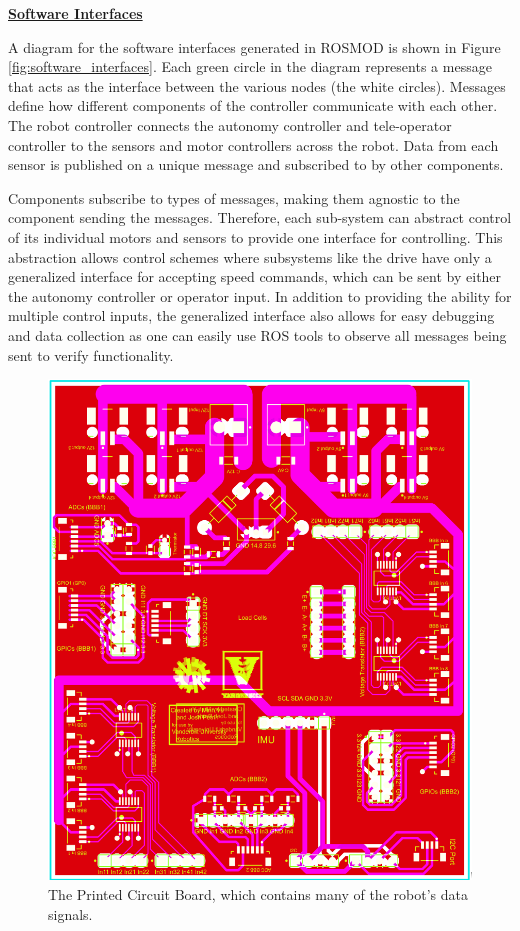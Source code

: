 \documentclass[class=article, crop=false]{standalone}
\begin{document}
	\vspace*{0.1in}
	\noindent\textbf{\underline{Software Interfaces}}
	
	A diagram for the software interfaces generated in ROSMOD is shown in Figure \ref{fig:software_interfaces}. Each green circle in the diagram represents a message that acts as the interface between the various nodes (the white circles). Messages define how different components of the controller communicate with each other. The robot controller connects the autonomy controller and tele-operator controller to the sensors and motor controllers across the robot. Data from each sensor is published on a unique message and subscribed to by other components. 
	
	Components subscribe to types of messages, making them agnostic to the component sending the messages. Therefore, each sub-system can abstract control of its individual motors and sensors to provide one interface for controlling. This abstraction allows control schemes where subsystems like the drive have only a generalized interface for accepting speed commands, which can be sent by either the autonomy controller or operator input. In addition to providing the ability for multiple control inputs, the generalized interface also allows for easy debugging and data collection as one can easily use ROS tools to observe all messages being sent to verify functionality.
		
	\FloatBarrier
	\begin{figure}[h]
		\centering
		\includegraphics[width=0.6\linewidth]{09_Figures/pcb.jpg}
		\caption{The Printed Circuit Board, which contains many of the robot's data signals.}
		\label{fig:pcb}
	\end{figure}
	\FloatBarrier
	
	
\end{document}
